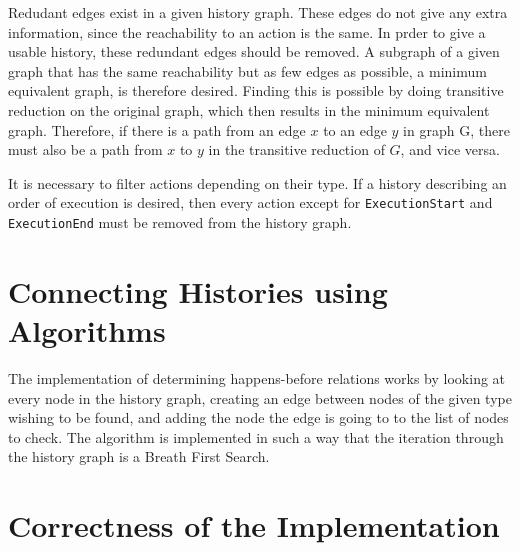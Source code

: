 	Redudant edges exist in a given history graph. These edges do not give any extra information, since the reachability to an action is the same. In prder to give a usable history, these redundant edges should be removed. 
	A subgraph of a given graph that has the same reachability but as few edges as possible, a minimum equivalent graph, is therefore desired. Finding this is possible by doing transitive reduction on the original graph, which then results in the minimum equivalent graph. 
	Therefore, if there is a path from an edge $x$ to an edge $y$ in graph G, there must also be a path from $x$ to $y$ in the transitive reduction of $G$, and vice versa. 
	
	
	It is necessary to filter actions depending on their type. If a history describing an order of execution is desired, then every action except for \texttt{ExecutionStart} and \texttt{ExecutionEnd} must be removed from the history graph. 
	
	\section{Connecting Histories using Algorithms} %
	The implementation of determining happens-before relations works by looking at every node in the history graph, creating an edge between nodes of the given type wishing to be found, and adding the node the edge is going to to the list of nodes to check. The algorithm is implemented in such a way that the iteration through the history graph is a Breath First Search. 
	
	\section{Correctness of the Implementation} %
	